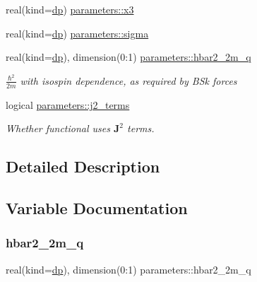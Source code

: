 \begin{DoxyCompactItemize}
real(kind=\mbox{\hyperlink{namespaceparameters_a52f8c6351fd79345d8811e065bcbbb37}{dp}}) \mbox{\hyperlink{group__SKYRME__PARS_ga361bcdef664c7f70557bcc2f42b2abce}{parameters\+::x3}}
\item 
real(kind=\mbox{\hyperlink{namespaceparameters_a52f8c6351fd79345d8811e065bcbbb37}{dp}}) \mbox{\hyperlink{group__SKYRME__PARS_ga3726a27918a1e2929cdac9ffd451ec14}{parameters\+::sigma}}
\item 
real(kind=\mbox{\hyperlink{namespaceparameters_a52f8c6351fd79345d8811e065bcbbb37}{dp}}), dimension(0\+:1) \mbox{\hyperlink{group__SKYRME__PARS_ga8eaaa7306780e89ea9299163596ebc7f}{parameters\+::hbar2\+\_\+2m\+\_\+q}}
\begin{DoxyCompactList}\small\item\em $\frac{\hbar^2}{2m}$ with isospin dependence, as required by B\+Sk forces \end{DoxyCompactList}\item 
logical \mbox{\hyperlink{group__SKYRME__PARS_ga8d1441b6c74260a2058e73213ae60941}{parameters\+::j2\+\_\+terms}}
\begin{DoxyCompactList}\small\item\em Whether functional uses $\textbf{J}^2$ terms. \end{DoxyCompactList}\end{DoxyCompactItemize}


\subsection{Detailed Description}


\subsection{Variable Documentation}
\mbox{\label{group__SKYRME__PARS_ga8eaaa7306780e89ea9299163596ebc7f}} 
\subsubsection{\texorpdfstring{hbar2\+\_\+2m\+\_\+q}{hbar2\_2m\_q}}
{\footnotesize\ttfamily real(kind=\mbox{\hyperlink{namespaceparameters_a52f8c6351fd79345d8811e065bcbbb37}{dp}}), dimension(0\+:1) parameters\+::hbar2\+\_\+2m\+\_\+q}



